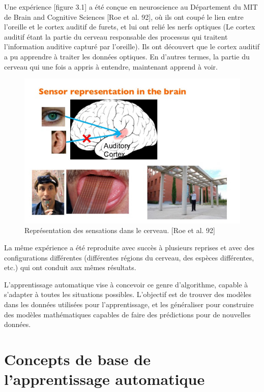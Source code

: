 	Une expérience [figure 3.1] a été conçue en neuroscience au Département du MIT de Brain and Cognitive Sciences [Roe et al. 92], où ils ont coupé le lien entre l'oreille et le cortex auditif de furets, et lui ont relié les nerfs optiques (Le cortex auditif étant la partie du cerveau responsable des processus qui traitent l'information auditive capturé par l'oreille). Ils ont découvert que le cortex auditif a pu apprendre à traiter les données optiques. En d'autres termes, la partie du cerveau qui une fois a appris à entendre, maintenant apprend à voir.

\begin{figure}[H]
	\centering
		\includegraphics[width=5in]{Figures/OneLearningAlgoAndreNg.jpg}
	\caption[An Electron]{Représentation des sensations dans le cerveau. [Roe et al. 92]}
	\label{fig:Electron}
\end{figure}


	La même expérience a été reproduite avec succès à plusieurs reprises et avec des configurations différentes (différentes régions du cerveau, des espèces différentes, etc.) qui ont conduit aux mêmes résultats.

	L'apprentissage automatique vise à concevoir ce genre d'algorithme, capable à s'adapter à toutes les situations possibles. L'objectif est de trouver des modèles dans les données utilisées pour l'apprentissage, et les généraliser pour construire des modèles mathématiques capables de faire des prédictions pour de nouvelles données.

\section{Concepts de base de l'apprentissage automatique}


